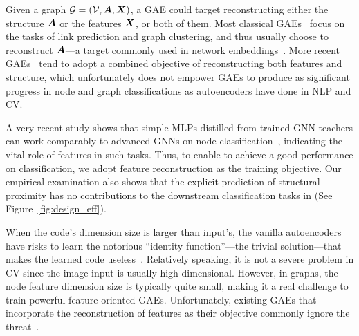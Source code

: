 Given a graph $\mathcal{G}=(\mathcal{V}, {\bm{A}}, {\bm{X}})$, a GAE could target reconstructing either  the structure ${\bm{A}}$ or the features ${\bm{X}}$, or both of them. 
Most classical GAEs~\cite{kipf2016variational,pan2018adversarially} focus on the tasks of  link prediction and graph clustering, and thus usually choose to reconstruct ${\bm{A}}$---a target commonly used in network embeddings~\cite{perozzi2014deepwalk,grover2016node2vec,tang2015line}. 
More recent GAEs~\cite{wang2017mgae,park2019symmetric,amin2020gate} tend to adopt a combined objective of reconstructing both features and structure, which unfortunately does not empower GAEs to produce as significant progress in node and graph classifications as autoencoders have done in NLP and CV. 


A very recent study shows that simple MLPs distilled from trained GNN teachers can work comparably to advanced GNNs on node classification~\cite{zhang2022graphless}, indicating the vital role of features in such tasks. 
Thus, to enable \model to achieve a good performance on classification, we adopt feature reconstruction as the  training objective. 
Our empirical examination also shows that the explicit prediction of structural proximity has no contributions to the downstream classification tasks in \model  
(See Figure~\ref{fig:design_eff}).



When the code's dimension size is larger than input's, the vanilla autoencoders have risks to learn the notorious ``identity function''---the trivial solution---that makes the learned code useless~\cite{vincent2008extracting}. 
Relatively speaking, it is not a severe problem in CV since the image input is usually  high-dimensional. 
However, in graphs, the node feature dimension size is typically quite small, making it a real challenge to train powerful feature-oriented GAEs. 
Unfortunately, existing GAEs that incorporate the reconstruction of features as their objective commonly ignore the threat~\cite{kipf2016variational, pan2018adversarially,park2019symmetric,cui2020adaptive,amin2020gate}. 

